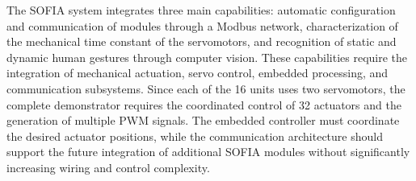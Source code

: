 \documentclass[lettersize,journal]{IEEEtran}
\begin{document}
	The SOFIA system integrates three main capabilities: automatic configuration
	and communication of modules through a Modbus network, characterization of the
	mechanical time constant of the servomotors, and recognition of static and
	dynamic human gestures through computer vision. These capabilities require the
	integration of mechanical actuation, servo control, embedded processing, and
	communication subsystems. Since each of the 16 units uses two servomotors, the
	complete demonstrator requires the coordinated control of 32 actuators and the
	generation of multiple PWM signals. The embedded controller must coordinate
	the desired actuator positions, while the communication architecture should
	support the future integration of additional SOFIA modules without
	significantly increasing wiring and control complexity.
	
\end{document}
